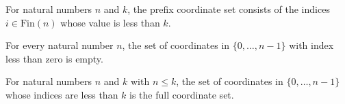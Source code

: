 \begin{definition}
\label{FABL.prefixCoordinates}
\leanok
For natural numbers $n$ and $k$, the prefix coordinate set consists of the indices
$i\in\mathrm{Fin}(n)$ whose value is less than $k$.
\end{definition}

\begin{theorem}
\label{FABL.prefixCoordinates_zero}
\leanok
{}
For every natural number $n$, the set of coordinates in $\{0,\ldots,n-1\}$ with index
less than zero is empty.
\end{theorem}

\begin{theorem}
\label{FABL.prefixCoordinates_eq_univ}
\leanok
{}
For natural numbers $n$ and $k$ with $n\le k$, the set of coordinates in
$\{0,\ldots,n-1\}$ whose indices are less than $k$ is the full coordinate set.
\end{theorem}

